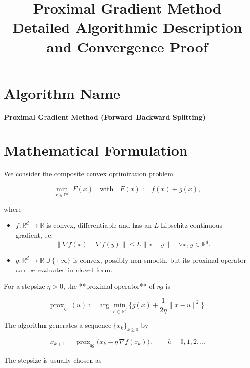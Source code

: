 \documentclass{article}
\newcommand{\prox}{\operatorname{prox}}
\newcommand{\grad}{\nabla}
\newcommand{\R}{\mathbb{R}}
\begin{document}
\title{Proximal Gradient Method \\ Detailed Algorithmic Description and Convergence Proof}
\author{}
\date{}
\maketitle

\tableofcontents
\newpage

\section*{Algorithm Name}
\begin{center}
\textbf{Proximal Gradient Method (Forward–Backward Splitting)}
\end{center}

\section*{Mathematical Formulation}
We consider the composite convex optimization problem  

\[
\min_{x\in \R^{d}} \; F(x) \quad\text{with}\quad 
F(x):=f(x)+g(x),
\]

where  

\begin{itemize}
\item $f:\R^{d}\rightarrow\R$ is convex, differentiable and has an $L$‑Lipschitz continuous gradient, i.e.  
\[
\|\grad f(x)-\grad f(y)\| \le L\|x-y\|\quad\forall x,y\in\R^{d}.
\]
\item $g:\R^{d}\rightarrow\R\cup\{+\infty\}$ is convex, possibly non‑smooth, but its proximal operator can be evaluated in closed form.
\end{itemize}

For a stepsize $\eta>0$, the **proximal operator** of $\eta g$ is  

\[
\prox_{\eta g}(u):=\arg\min_{x\in\R^{d}}
\Big\{ g(x)+\frac{1}{2\eta}\|x-u\|^{2}\Big\}.
\]

The algorithm generates a sequence $\{x_k\}_{k\ge0}$ by  

\[
\boxed{\,x_{k+1}= \prox_{\eta g}\bigl(x_k-\eta \,\grad f(x_k)\bigr)\,},\qquad k=0,1,2,\dots
\tag{1}
\]

The stepsize is usually chosen as  
\end{document}
